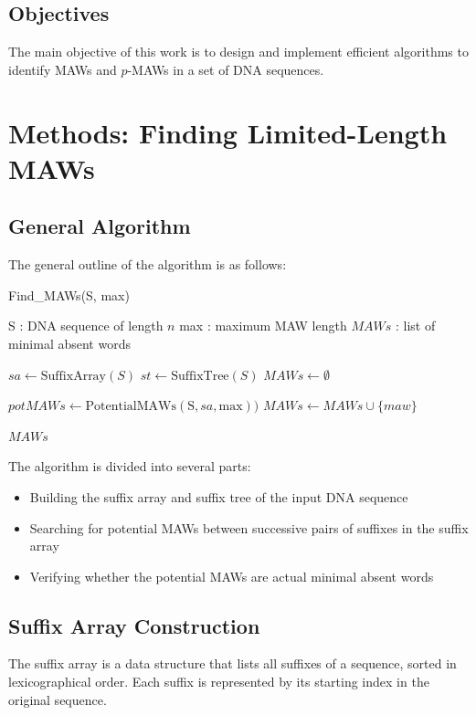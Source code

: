 \documentclass[conference]{IEEEtran}
\begin{document}
\subsection{Objectives}
The main objective of this work is to design and implement efficient algorithms to identify MAWs and $p$-MAWs in a set of DNA sequences.\section{Methods: Finding Limited-Length MAWs}
\subsection{General Algorithm}
The general outline of the algorithm is as follows:
\begin{algorithm}
\caption{Find\_MAWs(S, max)}
\begin{algorithmic}[1]
\Require S : DNA sequence of length $n$
\Require max : maximum MAW length
\Ensure $MAWs$ : list of minimal absent words

\State $sa \gets \text{SuffixArray}(S)$
\State $st \gets \text{SuffixTree}(S)$
\State $MAWs \gets \emptyset$

\State $potMAWs \gets \text{PotentialMAWs}(\text{S}, sa, \text{max}))$
        \State $MAWs \gets MAWs \cup \{maw\}$
    \EndIf
\EndFor

\State \Return $MAWs$
\end{algorithmic}
\end{algorithm}

The algorithm is divided into several parts:
\begin{itemize}
\item Building the suffix array and suffix tree of the input DNA sequence
\item Searching for potential MAWs between successive pairs of suffixes in the suffix array
\item Verifying whether the potential MAWs are actual minimal absent words
\end{itemize}
\subsection{Suffix Array Construction}
The suffix array is a data structure that lists all suffixes of a sequence, sorted in lexicographical order. Each suffix is represented by its starting index in the original sequence.
\end{document}

